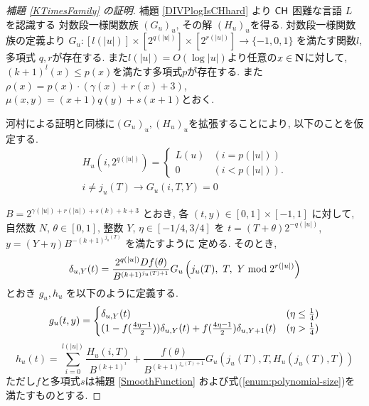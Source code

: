  \begin{proof}[\rm 補題 \ref{KTimesFamily} の証明]
  補題 \ref{DIVPlogIsCHhard} より
  $\mathsf{CH}$ 困難な言語 $L$ を認識する
  対数段一様関数族 $(G_u)_u$, その解 $(H_u)_u$を得る.
  対数段一様関数族の定義より 
  $G_u \colon [l(|u|)] \times [2^{q(|u|)}] \times [2^{r(|u|)}] \to \{-1, 0, 1\}$
  を満たす関数$l$, 多項式 $q,r$が存在する. 
  また$l(|u|) = O(\log |u|)$より任意の$x \in \mathbf N$に対して,
  $(k+1)^l(x) \le p(x)$を満たす多項式$p$が存在する.
  また$\rho(x) = p(x) \cdot (\gamma(x) + r(x) + 3)$, 
  $\mu(x, y) = (x+1)q(y) + s(x+1)$とおく.

  河村による証明と同様に$(G_u)_u, (H_u)_u$を拡張することにより,
  以下のことを仮定する.
  \begin{gather}
   H_u(i, 2^{q(|u|)}) = \begin{cases}
			L(u) & (i=p(|u|)) \\
			0 & (i<p(|u|)).
			\end{cases}
   \\
   i \not = j_u(T)  \to G_u(i, T, Y) = 0 
  \end{gather}
  

 $B = 2^{\gamma(|u|) + r(|u|) + s(k) + k + 3}$ とおき, 
 各 $(t, y) \in [0,1] \times [-1, 1]$ に対して,
 自然数 $N$, $\theta \in [0,1]$, 整数 $Y$, $\eta \in [-1/4, 3/4]$ を
 $t = (T + \theta)2^{-q(|u|)}$, $y = (Y + \eta)B^{-(k+1)^{j_u(T)}}$ を満たすように
 定める.
  そのとき,
 \begin{equation} \label{eq:delta}
  \delta_{u, Y} (t) = \frac{2^{q(|u|)} D f(\theta)}{B^{(k+1)^{j_u(T)+1}}} 
   G_u\left( j_u(T),\ T,\ Y \bmod 2^{r(|u|)} \right)
 \end{equation}
 とおき $g_u, h_u$ を以下のように定義する.
 \begin{equation}
  \label{eq:gu}
\\  g_u(t,y) 
  = \begin{cases}
     \delta_{u, Y}(t)
     & (\eta \le \frac 1 4)
     \\
     ( 1-f ( \frac{4\eta-1}{2})) \delta_{u, Y}(t) 
     + f ( \frac{4\eta-1}{2}) \delta_{u,Y+1}(t)
     & (\eta > \frac 1 4)
    \end{cases}
 \end{equation}
 \begin{equation} 
  h_u(t) 
   = \sum^{l(|u|)}_{i=0} \frac{H_u(i, T)}{B^{(k+1)^i}}  
  + \frac{f(\theta)}{B^{(k+1)^{j_u(T)+1}}} G_u(j_u(T), T, H_u(j_u(T), T)) 
  \label{eq:hu}
 \end{equation}
  ただし$f$と多項式$s$は補題 \ref{SmoothFunction}
  および式(\ref{enum:polynomial-size})を満たすものとする.



\end{proof}
